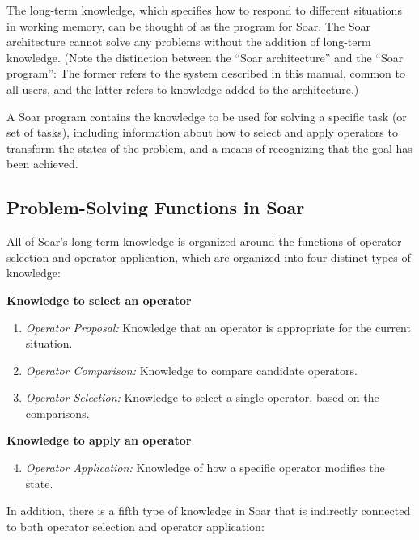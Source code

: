 The long-term knowledge, which specifies how to respond to different
situations in working memory, can be thought of as the program for Soar.
The Soar architecture cannot solve any problems without the addition of
long-term knowledge.  (Note the distinction between the ``Soar
architecture'' and the ``Soar program'': The former refers to the system
described in this manual, common to all users, and the latter refers to
knowledge added to the architecture.)

A Soar program contains the knowledge to be used for solving a specific
task (or set of tasks), including information about how to select and
apply operators to transform the states of the problem, and a means of
recognizing that the goal has been achieved.  

\subsection{Problem-Solving Functions in Soar}
\label{ARCH-functions}

\label{LIST:5functions}
All of Soar's long-term knowledge is organized around the functions of operator 
selection and operator application, which are organized into  four distinct types of
knowledge:\vspace{-10pt} 
\begin{description}
\item \textbf{Knowledge to select an operator} \\ \vspace{-20pt}
  \begin{enumerate}
  \item \textit{Operator Proposal:} Knowledge that an operator is appropriate for the current situation. 
  \item \textit{Operator Comparison:} Knowledge to compare candidate operators.
  \item 	\textit{Operator Selection:} Knowledge to select a single operator, based on the comparisons.
  \end{enumerate}
\item \textbf{Knowledge to apply an operator} \\  \vspace{-20pt}
  \begin{enumerate} \setcounter{enumi}{3}
  \item \textit{Operator Application:} Knowledge of how a specific operator modifies the state.
\end{enumerate}
\end{description}
In addition, there is a fifth type of knowledge in Soar that is
indirectly connected to both operator selection and operator application:

